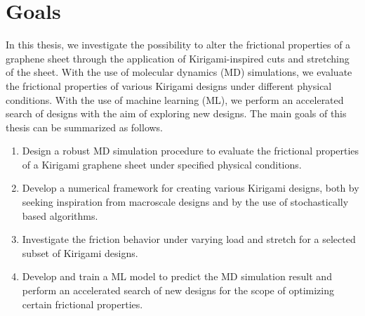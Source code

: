 \section{Goals} %
In this thesis, we investigate the possibility to alter the frictional
properties of a graphene sheet through the application of Kirigami-inspired cuts and stretching of the sheet. With the use of molecular dynamics (\acrshort{MD}) simulations, we evaluate the frictional properties of various Kirigami designs under different physical conditions. With the use of machine learning (\acrshort{ML}), we perform an accelerated search of designs with the aim of exploring new designs. The main goals of this thesis can be summarized as follows.
\begin{enumerate} 
    \item Design a robust \acrshort{MD} simulation procedure to evaluate the frictional properties of a Kirigami graphene sheet under specified physical conditions.
    \item Develop a numerical framework for creating various Kirigami designs, both by seeking inspiration from macroscale designs and by the use of stochastically based algorithms.
    \item Investigate the friction behavior under varying load and stretch for a selected subset of Kirigami designs.
    \item Develop and train a \acrshort{ML} model to predict the \acrshort{MD} simulation result and perform an accelerated search of new designs for the scope of optimizing certain frictional properties.
\end{enumerate}





